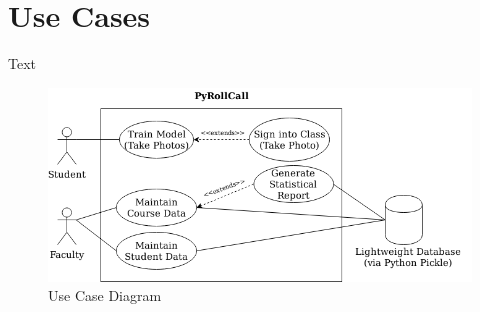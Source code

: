 \section{Use Cases}
Text

\begin{figure}[b!]
  \centering
  \includegraphics[width=\linewidth]{figures/use-case.png}
  \caption{Use Case Diagram}
  \label{fig:implementation}
\end{figure}

